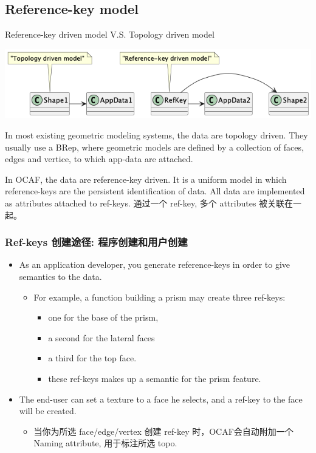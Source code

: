 \documentclass[11pt]{article}
\begin{document}
\subsection{Reference-key model}
\label{sec:orgc16058b}

Reference-key driven model V.S. Topology driven model

\begin{center}
\includegraphics[width=.9\linewidth]{img/reference-key-model.png}
\end{center}

In most existing geometric modeling systems, the data are topology driven. They usually use a BRep, where geometric models are defined by a collection of faces, edges and vertice, to which app-data are attached.

In OCAF, the data are reference-key driven. It is a uniform model in which reference-keys are the persistent identification of data. All data are implemented as attributes attached to ref-keys. 通过一个 ref-key, 多个 attributes 被关联在一起。
\subsubsection{Ref-keys 创建途径: 程序创建和用户创建}
\label{sec:org37eb675}

\begin{itemize}
\item As an application developer, you generate reference-keys in order to give semantics to the data.
\begin{itemize}
\item For example, a function building a prism may create three ref-keys:
\begin{itemize}
\item one for the base of the prism,
\item a second for the lateral faces
\item a third for the top face.
\item these ref-keys makes up a semantic for the prism feature.
\end{itemize}
\end{itemize}
\item The end-user can set a texture to a face he selects, and a ref-key to the face will be created.
\begin{itemize}
\item 当你为所选 face/edge/vertex 创建 ref-key 时，OCAF会自动附加一个 Naming attribute, 用于标注所选 topo.
\end{itemize}
\end{itemize}
\end{document}
